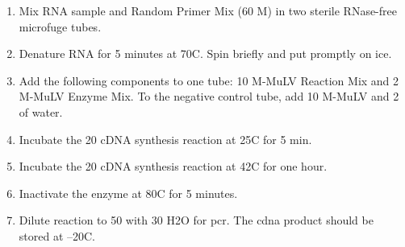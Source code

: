 \begin{enumerate}
\item Mix RNA sample and Random Primer Mix (60 \textmu M) in two sterile RNase-free microfuge tubes.
\item Denature RNA for 5 minutes at 70\degree C. Spin briefly and put promptly on ice. 
\item Add the following components to one tube: 10 \uL M-MuLV Reaction Mix and 2 \uL M-MuLV Enzyme Mix. To the negative control tube, add 10 \uL M-MuLV and 2 \uL of water.
\item  Incubate the 20 \uL cDNA synthesis reaction at 25\degree C for 5 min.
\item Incubate the 20 \uL cDNA synthesis reaction at 42\degree C for one hour.
\item Inactivate the enzyme at 80\degree C for 5 minutes. 
\item Dilute reaction to 50 \uL with 30 \uL H2O for \gls{pcr}. The \gls{cdna} product should be stored at –20\degree C. 
\end{enumerate}


